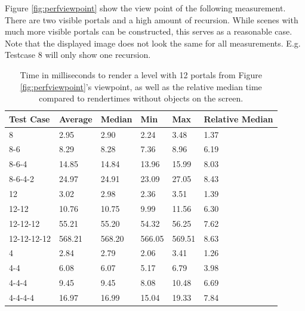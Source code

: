 Figure \ref{fig:perfviewpoint} show the view point of the following measurement. There are two visible portals and a high amount of recursion. While scenes with much more visible portals can be constructed, this serves as a reasonable case. Note that the displayed image does not look the same for all measurements. E.g. Testcase 8 will only show one recursion.

\begin{table}[H]
	\label{tab:perfviewpoint}
	\begin{tabular}{|l|l|l|l|l|l|}
		\hline
		Test Case   & Average & Median & Min    & Max    & Relative Median \\ \hline
		8           & 2.95    & 2.90   & 2.24   & 3.48   & 1.37            \\ \hline
		8-6         & 8.29    & 8.28   & 7.36   & 8.96   & 6.19            \\ \hline
		8-6-4       & 14.85   & 14.84  & 13.96  & 15.99  & 8.03            \\ \hline
		8-6-4-2     & 24.97   & 24.91  & 23.09  & 27.05  & 8.43            \\ \hline
		12          & 3.02    & 2.98   & 2.36   & 3.51   & 1.39            \\ \hline
		12-12       & 10.76   & 10.75  & 9.99   & 11.56  & 6.30            \\ \hline
		12-12-12    & 55.21   & 55.20  & 54.32  & 56.25  & 7.62            \\ \hline
		12-12-12-12 & 568.21  & 568.20 & 566.05 & 569.51 & 8.63            \\ \hline
		4           & 2.84    & 2.79   & 2.06   & 3.41   & 1.26            \\ \hline
		4-4         & 6.08    & 6.07   & 5.17   & 6.79   & 3.98            \\ \hline
		4-4-4       & 9.45    & 9.45   & 8.08   & 10.48  & 6.69            \\ \hline
		4-4-4-4     & 16.97   & 16.99  & 15.04  & 19.33  & 7.84            \\ \hline
	\end{tabular}
	\caption{Time in milliseconds to render a level with 12 portals from Figure \ref{fig:perfviewpoint}'s viewpoint, as well as the relative median time compared to rendertimes without objects on the screen.}
\end{table}


